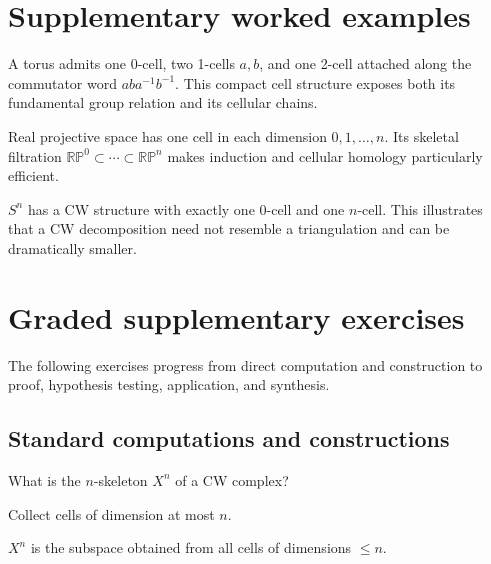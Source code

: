 \section{Supplementary worked examples}
\label{sec:viii06-pedagogy}

\begin{example}\label{ex:viii06-ped-01}
A torus admits one 0-cell, two 1-cells $a,b$, and one 2-cell attached along the commutator word $aba^{-1}b^{-1}$.  This compact cell structure exposes both its fundamental group relation and its cellular chains.
\end{example}

\begin{example}\label{ex:viii06-ped-02}
Real projective space has one cell in each dimension $0,1,\ldots,n$.  Its skeletal filtration $\mathbb{RP}^0\subset\cdots\subset\mathbb{RP}^n$ makes induction and cellular homology particularly efficient.
\end{example}

\begin{example}\label{ex:viii06-ped-03}
$S^n$ has a CW structure with exactly one 0-cell and one $n$-cell.  This illustrates that a CW decomposition need not resemble a triangulation and can be dramatically smaller.
\end{example}

\section{Graded supplementary exercises}
The following exercises progress from direct computation and construction to proof, hypothesis testing, application, and synthesis.

\subsection*{Standard computations and constructions}

\begin{exercise}\label{exr:viii06-ped-01}
What is the $n$-skeleton $X^n$ of a CW complex?
\end{exercise}
\begin{hint}
Collect cells of dimension at most $n$.
\end{hint}
\begin{solution}
$X^n$ is the subspace obtained from all cells of dimensions $\le n$.
\end{solution}

